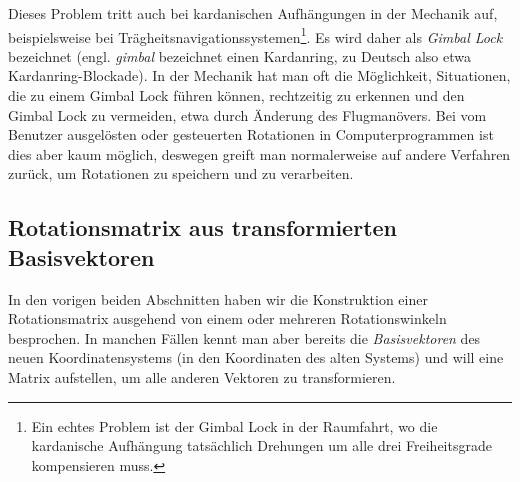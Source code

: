Dieses Problem tritt auch bei kardanischen Aufhängungen in der Mechanik auf, beispielsweise bei Trägheitsnavigationssystemen\footnote{Ein echtes Problem ist der Gimbal Lock in der Raumfahrt, wo die kardanische Aufhängung tatsächlich Drehungen um alle drei Freiheitsgrade kompensieren muss. }. Es wird daher als \emph{Gimbal Lock} bezeichnet (engl. \emph{gimbal} bezeichnet einen Kardanring, zu Deutsch also etwa Kardanring-Blockade). In der Mechanik hat man oft die Möglichkeit, Situationen, die zu einem Gimbal Lock führen können, rechtzeitig zu erkennen und den Gimbal Lock zu vermeiden, etwa durch Änderung des Flugmanövers. Bei vom Benutzer ausgelösten oder gesteuerten Rotationen in Computerprogrammen ist dies aber kaum möglich, deswegen greift man normalerweise auf andere Verfahren zurück, um Rotationen zu speichern und zu verarbeiten.

\subsection{Rotationsmatrix aus transformierten Basisvektoren}
\label{rotationbasevectors}
In den vorigen beiden Abschnitten haben wir die Konstruktion einer Rotationsmatrix ausgehend von einem oder mehreren Rotationswinkeln besprochen. In manchen Fällen kennt man aber bereits die \emph{Basisvektoren} des neuen Koordinatensystems (in den Koordinaten des alten Systems) und will eine Matrix aufstellen, um alle anderen Vektoren zu transformieren.

